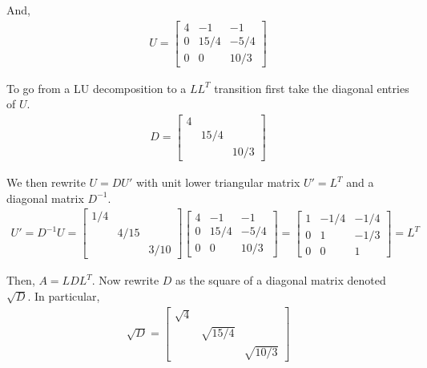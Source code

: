 \documentclass[10pt]{article}
\begin{document}
\begin{solution}[Solution]
And,
\begin{align*}
    U= 
\left[ \begin{array}{rrr} 4 & -1 & -1 \\ 0 & 15/4 & -5/4 \\ 0 & 0 & 10/3 \end{array} \right] 
\end{align*}

To go from a LU decomposition to a \( LL^T \) transition first take the diagonal entries of \( U \).
\begin{align*}
    D = \left[\begin{array}{rrr}4 && \\ & 15/4 &\\ & & 10/3\end{array}\right]
\end{align*}

We then rewrite \( U = DU' \) with unit lower triangular matrix \( U' = L^T \) and a diagonal matrix \( D^{-1} \).
\begin{align*}
    U' = D^{-1}U = \left[\begin{array}{rrr}1/4 & & \\ & 4/15 & \\ & & 3/10\end{array}\right]    
\left[ \begin{array}{rrr} 4 & -1 & -1 \\ 0 & 15/4 & -5/4 \\ 0 & 0 & 10/3 \end{array} \right] = 
    \left[\begin{array}{rrr}1 & -1/4 & -1/4 \\ 0 & 1 &  -1/3 \\ 0 & 0 & 1\end{array}\right] 
    =L^T
\end{align*}

    Then, \( A = LDL^T \). Now rewrite \( D \) as the square of a diagonal matrix denoted \( \sqrt{D} \). In particular,
\begin{align*}
    \sqrt{D} = \left[\begin{array}{rrr} \sqrt{4} && \\ & \sqrt{15/4} &\\ & & \sqrt{10/3}\end{array}\right]
\end{align*}


\end{solution}
\end{document}
